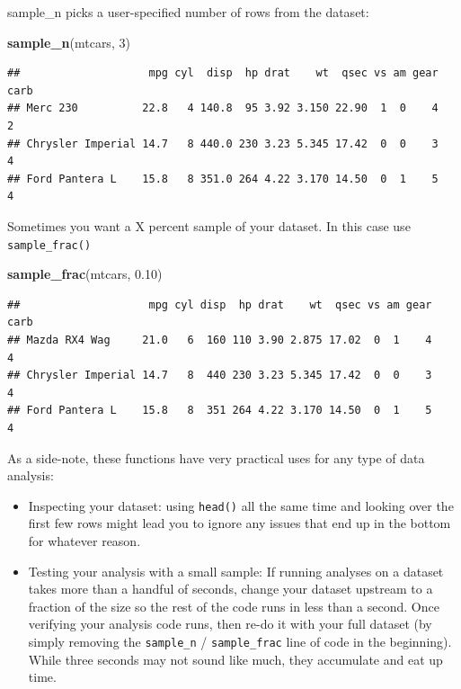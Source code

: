\documentclass[
]{book}
\newenvironment{Shaded}{\begin{snugshade}}{\end{snugshade}}
\newcommand{\DecValTok}[1]{\textcolor[rgb]{0.00,0.00,0.81}{#1}}
\newcommand{\FloatTok}[1]{\textcolor[rgb]{0.00,0.00,0.81}{#1}}
\newcommand{\KeywordTok}[1]{\textcolor[rgb]{0.13,0.29,0.53}{\textbf{#1}}}
\newcommand{\NormalTok}[1]{#1}
\providecommand{\tightlist}{%
  \setlength{\itemsep}{0pt}\setlength{\parskip}{0pt}}
\theoremstyle{definition}
\theoremstyle{definition}
\theoremstyle{definition}
\theoremstyle{definition}
\theoremstyle{remark}
\begin{document}
sample\_n picks a user-specified number of rows from the dataset:

\begin{Shaded}
\begin{Highlighting}[]
\KeywordTok{sample_n}\NormalTok{(mtcars, }\DecValTok{3}\NormalTok{)}
\end{Highlighting}
\end{Shaded}

\begin{verbatim}
##                    mpg cyl  disp  hp drat    wt  qsec vs am gear carb
## Merc 230          22.8   4 140.8  95 3.92 3.150 22.90  1  0    4    2
## Chrysler Imperial 14.7   8 440.0 230 3.23 5.345 17.42  0  0    3    4
## Ford Pantera L    15.8   8 351.0 264 4.22 3.170 14.50  0  1    5    4
\end{verbatim}

Sometimes you want a X percent sample of your dataset. In this case use \texttt{sample\_frac()}

\begin{Shaded}
\begin{Highlighting}[]
\KeywordTok{sample_frac}\NormalTok{(mtcars, }\FloatTok{0.10}\NormalTok{)}
\end{Highlighting}
\end{Shaded}

\begin{verbatim}
##                    mpg cyl disp  hp drat    wt  qsec vs am gear carb
## Mazda RX4 Wag     21.0   6  160 110 3.90 2.875 17.02  0  1    4    4
## Chrysler Imperial 14.7   8  440 230 3.23 5.345 17.42  0  0    3    4
## Ford Pantera L    15.8   8  351 264 4.22 3.170 14.50  0  1    5    4
\end{verbatim}

As a side-note, these functions have very practical uses for any type of data analysis:

\begin{itemize}
\tightlist
\item
  Inspecting your dataset: using \texttt{head()} all the same time and looking over the first few rows might lead you to ignore any issues that end up in the bottom for whatever reason.
\item
  Testing your analysis with a small sample: If running analyses on a dataset takes more than a handful of seconds, change your dataset upstream to a fraction of the size so the rest of the code runs in less than a second. Once verifying your analysis code runs, then re-do it with your full dataset (by simply removing the \texttt{sample\_n} / \texttt{sample\_frac} line of code in the beginning). While three seconds may not sound like much, they accumulate and eat up time.
\end{itemize}
\end{document}
